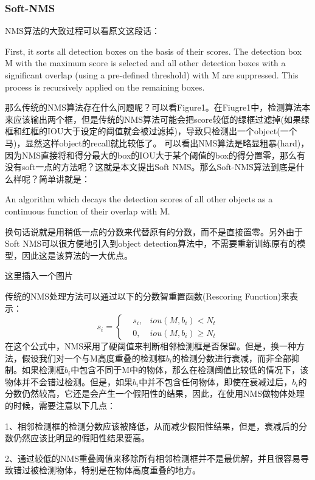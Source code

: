 
\subsubsection{Soft-NMS}
NMS算法的大致过程可以看原文这段话：

First, it sorts all detection boxes on the basis of their scores. The detection box M with the maximum score is selected and all other detection boxes with a significant overlap (using a pre-defined threshold) with M are suppressed. This process is recursively applied on the remaining boxes.

那么传统的NMS算法存在什么问题呢？可以看Figure1。在Fiugre1中，检测算法本来应该输出两个框，但是传统的NMS算法可能会把score较低的绿框过滤掉(如果绿框和红框的IOU大于设定的阈值就会被过滤掉)，导致只检测出一个object(一个马)，显然这样object的recall就比较低了。 
可以看出NMS算法是略显粗暴(hard)，因为NMS直接将和得分最大的box的IOU大于某个阈值的box的得分置零，那么有没有soft一点的方法呢？这就是本文提出Soft NMS。那么Soft-NMS算法到底是什么样呢？简单讲就是：

An algorithm which decays the detection scores of all other objects as a continuous function of their overlap with M.

换句话说就是用稍低一点的分数来代替原有的分数，而不是直接置零。另外由于Soft NMS可以很方便地引入到object detection算法中，不需要重新训练原有的模型，因此这是该算法的一大优点。

{\huge 这里插入一个图片}

传统的NMS处理方法可以通过以下的分数智重置函数(Rescoring Function)来表示：
\begin{equation}
	s_i = \left\{ 
		\begin{aligned}
		& s_i , &iou (M,b_i) < N_t \\
		& 0, 	&iou(M,b_i) \geq N_t
		\end{aligned}
		\right .
\end{equation}
在这个公式中，NMS采用了硬阈值来判断相邻检测框是否保留。但是，换一种方法，假设我们对一个与M高度重叠的检测框$b_i$的检测分数进行衰减，而非全部抑制。如果检测框$b_i$中包含不同于M中的物体，那么在检测阈值比较低的情况下，该物体并不会错过检测。但是，如果$b_i$中并不包含任何物体，即使在衰减过后，$b_i$的分数仍然较高，它还是会产生一个假阳性的结果，因此，在使用NMS做物体处理的时候，需要注意以下几点：

1、相邻检测框的检测分数应该被降低，从而减少假阳性结果，但是，衰减后的分数仍然应该比明显的假阳性结果要高。

2、通过较低的NMS重叠阈值来移除所有相邻检测框并不是最优解，并且很容易导致错过被检测物体，特别是在物体高度重叠的地方。

